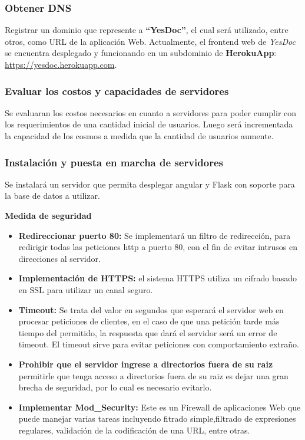 \subsubsection{Obtener DNS}
\begin{sloppypar}
Registrar un dominio que represente a \textbf{``YesDoc''}, el cual será utilizado, entre otros, como URL de la aplicación Web.
Actualmente, el frontend web de \textit{YesDoc} se encuentra desplegado y funcionando en un subdominio de \textbf{HerokuApp}: \url{https://yesdoc.herokuapp.com}.
\end{sloppypar}

\subsubsection{Evaluar los costos y capacidades de servidores}
Se evaluaran los costos necesarios en cuanto a servidores para poder  cumplir con los requerimientos de una cantidad inicial de usuarios. Luego será incrementada la capacidad de los cosmos a medida que la cantidad de usuarios aumente. 

\subsubsection{Instalación y puesta en marcha de servidores}
Se instalará un servidor que permita desplegar angular y Flask con soporte para la base de     datos a utilizar. 

\textbf{Medida de seguridad}
\begin{itemize}
	\item \textbf{Redireccionar puerto 80: } Se implementará un filtro de redirección, para redirigir todas las peticiones http a puerto 80, con el fin de evitar intrusos en direcciones al servidor.
	\item \textbf{Implementación de HTTPS: } el sistema HTTPS utiliza un cifrado basado en SSL para utilizar un canal seguro.
	\item \textbf{Timeout: }Se trata del valor en segundos que esperará el servidor web en procesar peticiones de clientes, en el caso de que una petición tarde más tiempo del permitido, la respuesta que dará el servidor será un error de timeout. El timeout sirve para evitar peticiones con comportamiento extraño.
	\item \textbf{Prohibir que el servidor ingrese a directorios fuera de su raiz} permitirle que tenga acceso a directorios fuera de su raiz es dejar una gran brecha de seguridad, por lo cual es necesario evitarlo.
	\item \textbf{Implementar Mod\_Security:} Este es un Firewall de aplicaciones Web que puede manejar varias tareas incluyendo fitrado simple,filtrado de expresiones regulares, validación de la codificación de una URL, entre otras.
\end{itemize}

